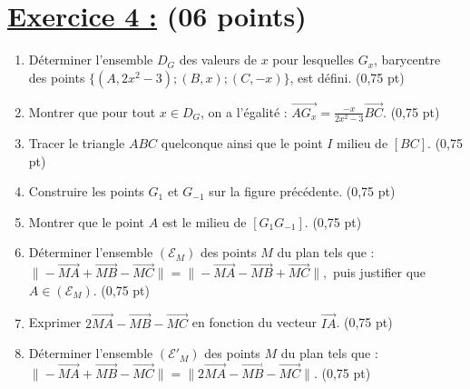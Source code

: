\documentclass[12pt,a4paper]{article}
\begin{document}
\section*{\underline{Exercice 4 :} (06 points)}

\begin{enumerate}
    \item Déterminer l’ensemble $D_G$ des valeurs de $x$ pour lesquelles $G_x$, barycentre\\ des points $\{(A, 2x^2 - 3); (B, x); (C, -x)\}$, est défini. \hfill (0,75 pt)

    \item Montrer que pour tout $x \in D_G$, on a l’égalité :
    \(
    \overrightarrow{AG_x} = \frac{-x}{2x^2 - 3} \overrightarrow{BC}.
    \) \hfill (0,75 pt)

    \item Tracer le triangle $ABC$ quelconque ainsi que le point $I$ milieu de $[BC]$. \hfill (0,75 pt)

    \item Construire les points $G_1$ et $G_{-1}$ sur la figure précédente. \hfill (0,75 pt)

    \item Montrer que le point $A$ est le milieu de $[G_1G_{-1}]$. \hfill (0,75 pt)

    \item Déterminer l’ensemble $(\mathscr{E}_M)$ des points $M$ du plan tels que :\\
    \(
    \|-\overrightarrow{MA} + \overrightarrow{MB} - \overrightarrow{MC}\| = \|-\overrightarrow{MA} - \overrightarrow{MB} + \overrightarrow{MC}\|,
    \)
    puis justifier que $A \in (\mathscr{E}_M)$. \hfill (0,75 pt)

    \item Exprimer $2\overrightarrow{MA} - \overrightarrow{MB} - \overrightarrow{MC}$ en fonction du vecteur $\overrightarrow{IA}$. \hfill (0,75 pt)

    \item Déterminer l’ensemble $(\mathscr{E}'_M)$ des points $M$ du plan tels que :\\
    \(
    \|-\overrightarrow{MA} + \overrightarrow{MB} - \overrightarrow{MC}\| = \|2\overrightarrow{MA} - \overrightarrow{MB} - \overrightarrow{MC}\|.
    \) \hfill (0,75 pt)
\end{enumerate}
\end{document}
